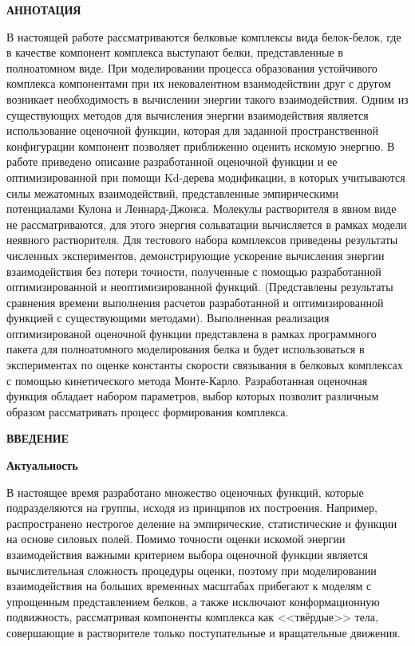 \newpage
\begin{center}
  \textbf{\large АННОТАЦИЯ}
\end{center}

В настоящей работе рассматриваются белковые комплексы вида белок-белок, где в качестве компонент комплекса выступают белки, представленные в полноатомном виде. При моделировании процесса образования устойчивого комплекса компонентами при их нековалентном взаимодействии друг с другом возникает необходимость в вычислении энергии такого взаимодействия. Одним из существующих методов для вычисления энергии взаимодействия является использование оценочной функции, которая для заданной пространственной конфигурации компонент позволяет приближенно оценить искомую энергию. В работе приведено описание разработанной оценочной функции и ее оптимизированной при помощи Kd-дерева модификации, в которых учитываются силы межатомных взаимодействий, представленные эмпирическими потенциалами Кулона и Леннард-Джонса. Молекулы растворителя в явном виде не рассматриваются, для этого энергия сольватации вычисляется в рамках модели неявного растворителя. Для тестового набора комплексов приведены результаты численных экспериментов, демонстрирующие ускорение вычисления энергии взаимодействия без потери точности, полученные с помощью разработанной оптимизированной и неоптимизированной функций. (Представлены результаты сравнения времени выполнения расчетов разработанной и оптимизированной функцией с существующими методами). Выполненная реализация оптимизированой оценочной функции представлена в рамках программного пакета для полноатомного моделирования белка и будет использоваться в экспериментах по оценке константы скорости связывания в белковых комплексах с помощью кинетического метода Монте-Карло. Разработанная оценочная функция обладает набором параметров, выбор которых позволит различным образом рассматривать процесс формирования комплекса.

\onehalfspacing
\setcounter{page}{2}

\newpage
\renewcommand{\contentsname}{\centerline{\large СОДЕРЖАНИЕ}}
\tableofcontents

\newpage
\begin{center}
  \textbf{\large ВВЕДЕНИЕ}
\end{center}

\textbf{Актуальность}

В настоящее время разработано множество оценочных функций, которые подразделяются на группы, исходя из принципов их построения. Например, распространено нестрогое деление на эмпирические, статистические и функции на основе силовых полей. Помимо точности оценки искомой энергии взаимодействия важными критерием выбора оценочной функции является вычислительная сложность процедуры оценки, поэтому при моделировании взаимодействия на больших временных масштабах прибегают к моделям с упрощенным представлением белков, а также исключают конформационную подвижность, рассматривая компоненты комплекса как <<твёрдые>> тела, совершающие в растворителе только поступательные и вращательные движения.

